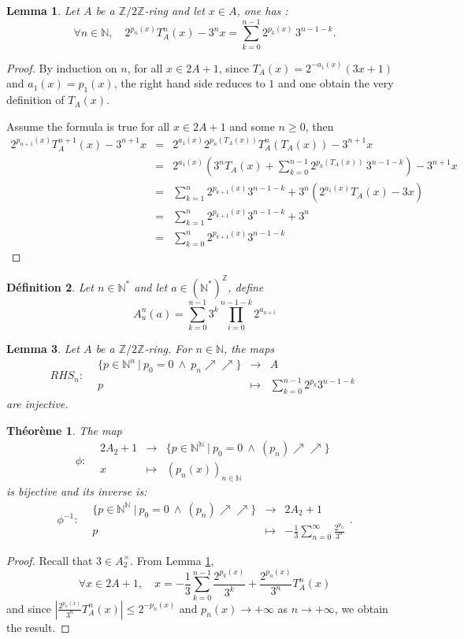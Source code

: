 \documentclass[12pt,a4paper]{article}
\newtheorem{lem}{Lemma}[section]
\newtheorem{defi}[lem]{Définition}
\newtheorem{theo}{Théorème}
\newcommand{\fonction}[5]{\displaystyle#1:\begin{array}{l|rcl}
& \displaystyle #2 & \longrightarrow & \displaystyle #3 \\
    & \displaystyle #4 & \longmapsto & \displaystyle #5 \end{array}}
\def\NN{\mathbb{N}}
\def\ZZ{\mathbb{Z}}
\begin{document}
\begin{lem}\label{lem:base}Let $A$ be a $\ZZ/2\ZZ$-ring and let $x\in A$, one has : 
$$\forall n\in \NN, \quad 2^{p_n(x)}T_A^n(x)-3^n x = \sum_{k=0}^{n-1} 2^{p_k(x)}\,3^{n-1-k} .$$
\end{lem}
\begin{proof} 
By induction on $n$, for all $x\in 2A+1$, since $T_A(x) = 2^{-a_1(x)}(3x+1)$ and $a_1(x)=p_1(x)$, the right hand side reduces to $1$ and one obtain the very definition of $T_A(x)$.

Assume the formula is true for all $x\in 2A+1$ and some $n \geq 0$, then 
\begin{eqnarray*}
2^{p_{n+1}(x)}T_A^{n+1}(x)-3^{n+1} x &=& 2^{a_{1}(x)} 2^{p_n(T_A(x))} T_A^n( T_A(x))-3^{n+1}x\\&=& 2^{a_1(x)} \left(3^n T_A(x)+ \sum_{k=0}^{n-1} 2^{p_k(T_A(x))}\,3^{n-1-k}  \right) - 3^{n+1}x  \\&=& \sum_{k=1}^{n} 2^{p_{k+1}(x)}3^{n-1-k}+3^n\left( 2^{a_1(x)}T_A(x)-3x\right)
\\&=&\sum_{k=1}^{n} 2^{p_{k+1}(x)}3^{n-1-k}+3^n 
\\&=& \sum_{k=0}^{n} 2^{p_{k+1}(x)}3^{n-1-k}
 \end{eqnarray*}
\end{proof}
\begin{defi}
Let $n\in\NN^*$ and let $a\in (\NN^*)^\ZZ$, define $$ A_{u}^n(a)=\sum_{k=0}
^{n-1}3^k\prod_{i=0}^{n-1-k}2^{a_{u+i}} $$ 
\end{defi}
\begin{lem} Let $A$ be a $\ZZ/2\ZZ$-ring. 
For $n\in \NN$, the maps $$\fonction{RHS_n}{\{p\in \NN^n~|~ p_0=0~\wedge~p_n \nearrow\nearrow \} }{A}{p}{\sum_{k=0}^{n-1}2^{p_k}3^{n-1-k}} $$ 
are injective.
\end{lem}
\begin{theo}\label{theo:rep} The map $$\fonction{\phi}{2A_2+1}{\{p\in \NN^\NN~|~ p_0=0 ~\wedge~ (p_n) \nearrow\nearrow\}}{x}{(p_n(x))_{n\in \NN}} $$
is bijective and its inverse is: 
$$\fonction{\phi^{-1}}{\{p\in \NN^\NN~|~ p_0=0 ~\wedge~ (p_n) \nearrow\nearrow\}}{2A_2+1}{p}{ -\frac{1}{3}\sum_{n = 0}^{\infty}\frac{2^{p_n}}{3^{n}}}.$$
\end{theo}
\begin{proof} Recall that $3\in A_2^{\times}$. From Lemma \ref{lem:base},
 $$\forall x\in 2A+1,\quad  x = -\frac{1}{3}\sum_{k=0}^{n-1}\frac{2^{p_k(x)}}{3^k}+ \frac{2^{p_n(x)}}{3^n}T_A^n(x)$$
and since $\left|\frac{2^{p_n(x)}}{3^n}T_A^n(x)  \right| \leq 2^{-p_n(x)} $ and $p_n(x)\rightarrow +\infty$ as $n\rightarrow +\infty$, we obtain the result. 
\end{proof}
\end{document}
